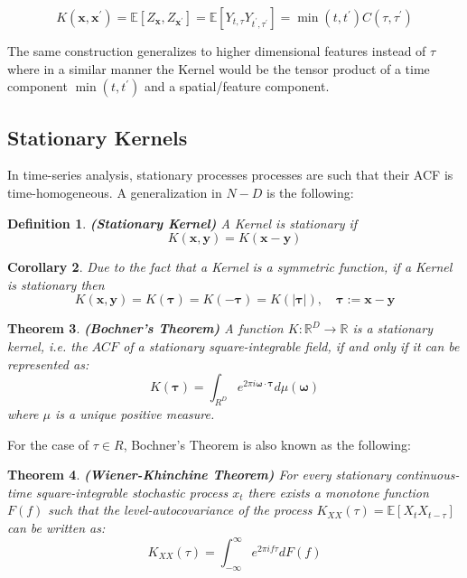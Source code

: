 \documentclass[11pt]{article}
\theoremstyle{plain} %
\newtheorem{theorem}{Theorem}[section]
\newtheorem{corollary}[theorem]{Corollary}
\newtheorem{definition}[theorem]{Definition}
\theoremstyle{remark}
\begin{document}
$$
  K\left(\mathbf{x}, \mathbf{x}^{\prime}\right)=\mathbb{E}\left[Z_{\mathbf{x}}, Z_{\mathbf{x}^{\prime}}\right]=\mathbb{E}\left[Y_{t, \tau} Y_{t^{\prime}, \tau^{\prime}}\right]=\min \left(t, t^{\prime}\right) C\left(\tau, \tau^{\prime}\right)
$$

The same construction generalizes to higher dimensional features instead of
$\tau$ where in a similar manner the Kernel would be the tensor product of a
time component $\min \left(t, t^{\prime}\right)$ and a spatial/feature component.

\subsection{Stationary Kernels}
In time-series analysis, stationary processes processes are such that their ACF
is time-homogeneous. A generalization in $N-D$ is the following:

\begin{definition}\textbf{(Stationary Kernel)}
  A Kernel is stationary if $$K(\mathbf{x}, \mathbf{y})=K(\mathbf{x}-\mathbf{y})$$
\end{definition}

\begin{corollary}
  Due to the fact that a Kernel is a symmetric function, if a Kernel is stationary then
  $$K(\mathbf{x},
    \mathbf{y})=K(\boldsymbol{\tau})=K(-\boldsymbol{\tau})=K(|\boldsymbol{\tau}|),
    \quad \boldsymbol{\tau}:=\mathbf{x}-\mathbf{y}$$
\end{corollary}

\begin{theorem}
  \textbf{(Bochner's Theorem)} A function $K: \mathbb{R}^{D} \rightarrow \mathbb{R}$ is a stationary kernel,
  i.e. the $A C F$ of a stationary square-integrable field, if and only if it can
  be represented as:
  $$
    K(\boldsymbol{\tau})=\int_{R^{D}} e^{2 \pi i \boldsymbol{\omega} \cdot \boldsymbol{\tau}} d \mu(\boldsymbol{\omega})
  $$
  where $\mu$ is a unique positive measure.
\end{theorem}

For the case of $\tau \in R$, Bochner's Theorem is also known as the following:
\begin{theorem}
  \textbf{(Wiener-Khinchine Theorem)} For every stationary continuous-time square-integrable stochastic process
  $x_{t}$ there exists a monotone function $F(f)$ such that the
  level-autocovariance of the process $K_{X X}(\tau)=\mathbb{E}\left[X_{t}
      X_{t-\tau}\right]$ can be written as:
  $$
    K_{X X}(\tau)=\int_{-\infty}^{\infty} e^{2 \pi i f \tau} d F(f)
  $$
\end{theorem}
\end{document}
